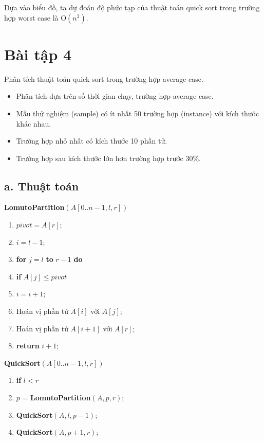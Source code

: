 \documentclass[12pt, a4paper, fleqn]{article}
\begin{document}
	Dựa vào biểu đồ, ta dự đoán độ phức tạp của thuật toán quick sort trong trường hợp worst case là O$(n^2)$.
	
	\clearpage
	
	\section*{Bài tập 4}
	
	
	Phân tích thuật toán quick sort trong trường hợp average case.
	\begin{itemize}
		\item Phân tích dựa trên số thời gian chạy, trường hợp average case.
		\item Mẫu thử nghiệm (sample) có ít nhất 50 trường hợp (instance) với kích thước khác nhau.
		\item Trường hợp nhỏ nhất có kích thước 10 phần tử.
		\item Trường hợp sau kích thước lớn hơn trường hợp trước 30\%.
	\end{itemize}

	\subsection*{a. Thuật toán}
	
	\textbf{LomutoPartition}$(A[0..n - 1, l, r])$	
	
	\begin{enumerate}
		\item $pivot = A[r]$;
		\item $i = l - 1$;
		\item \textbf{for} $j = l$ \textbf{to} $r - 1$ \textbf{do}
		\item \qquad \textbf{if} $A[j] \leq pivot$
		\item \qquad \qquad$i = i + 1$;
		\item \qquad \qquad Hoán vị phần tử $A[i]$ với $A[j]$;
		\item Hoán vị phần tử $A[i + 1]$ với $A[r]$;
		\item \textbf{return} $i + 1$; \\
	\end{enumerate}
	
	\textbf{QuickSort}$(A[0..n - 1, l, r])$
	
	\begin{enumerate}
		\item \textbf{if} $l < r$
		\item \qquad $p$ = \textbf{LomutoPartition}$(A, p, r)$;
		\item \qquad \textbf{QuickSort}$(A, l, p - 1)$;
		\item \qquad \textbf{QuickSort}$(A, p + 1, r)$;
	\end{enumerate}
\end{document}
